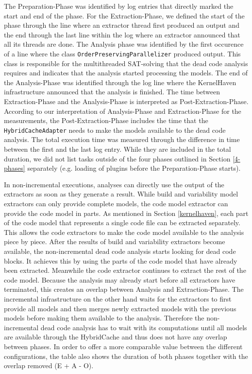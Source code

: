 \documentclass[a4paper]{article}
\begin{document}
The Preparation-Phase was identified by log entries that directly marked the start and end of the phase. For the Extraction-Phase, we defined the start of the phase through the line where an extractor thread first produced an output and the end through the last line within the log where an extractor announced that all its threads are done. The Analysis phase was identified by the first occurence of a line where the class \texttt{OrderPreservingParallelizer} produced output. This class is responsible for the multithreaded SAT-solving that the dead code analysis requires and indicates that the analysis started processing the models. The end of the Analysis-Phase was identified through the log line where the KernelHaven infrastructure announced that the analysis is finished. The time between Extraction-Phase and the Analysis-Phase is interpreted as Post-Extraction-Phase. According to our interpretation of Analysis-Phase and Extraction-Phase for the measurements, the Post-Extraction-Phase includes the time that the \texttt{Hybrid\-Cache\-Adapter} needs to make the models available to the dead code analysis. The total execution time was measured through the difference in time between the first and the last log entry. While they are included in the total duration, we did not list tasks outside of the four phases outlined in Section \ref{4-phases} separately (e.g. loading of plugins before the Preparation-Phase starts).

In non-incremental executions, analyses can directly use the output of the extractors as soon as they generate a result. While build and variability model extractors can only provide complete models, the code model extractor can provide the code model in parts. As mentioned in Section \ref{kernelhaven}, each part of the code model that represents a single code file can be extracted separately. This allows the code extractors to make the code model available to the analysis piece by piece.
After the results of build and variability extractors become available, the non-incremental dead code analysis starts looking for dead code blocks. It achieves this by using the parts of the code model that  have already been extracted. Meanwhile the code extractor continues to extract the rest of the code model. Because the analysis may already start before all extractors have terminated, this creates an overlap between Analysis and Extraction-Phase. The incremental infrastructure on the other hand waits for the extractors to first provide all models and then merges newly extracted models with the previous models before making them available to the analysis. Therefore the non-incremental dead code analysis has to wait with its computations until all models are available through the HybridCache and thus does not have any overlap between phases. In order to offer a more comparable value between the different configurations, the table also shows the duration of both phases together with the overlap removed (E + A - O). 
\end{document}
